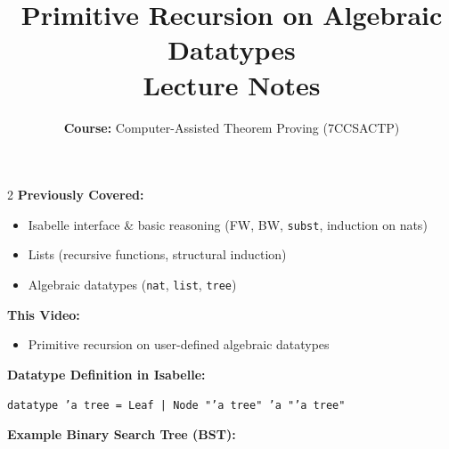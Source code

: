 \documentclass[10pt,a4paper]{article}
\title{\textbf{\huge Primitive Recursion on Algebraic Datatypes}\\[0.3em]
\large Lecture Notes}
\author{\textbf{Course:} Computer-Assisted Theorem Proving (7CCSACTP)}
\date{}
\begin{document}
\maketitle
\vspace{-1.5em}

\begin{tcolorbox}[title={1. Context \& Binary Tree Datatype Definition}]
\begin{multicols}{2}
\textbf{Previously Covered:}
\begin{itemize}[leftmargin=1.2em, itemsep=2pt]
    \item Isabelle interface \& basic reasoning (FW, BW, \texttt{subst}, induction on nats)
    \item Lists (recursive functions, structural induction)
    \item Algebraic datatypes (\texttt{nat}, \texttt{list}, \texttt{tree})
\end{itemize}

\textbf{This Video:}
\begin{itemize}[leftmargin=1.2em, itemsep=2pt]
    \item Primitive recursion on user-defined algebraic datatypes
\end{itemize}

\columnbreak

\textbf{Datatype Definition in Isabelle:}
\begin{center}
\texttt{datatype 'a tree = Leaf | Node "'a tree" 'a "'a tree"}
\end{center}

\textbf{Example Binary Search Tree (BST):}
\begin{center}
\end{center}
\end{multicols}
\end{tcolorbox}

\vspace{0.3em}
\end{document}
